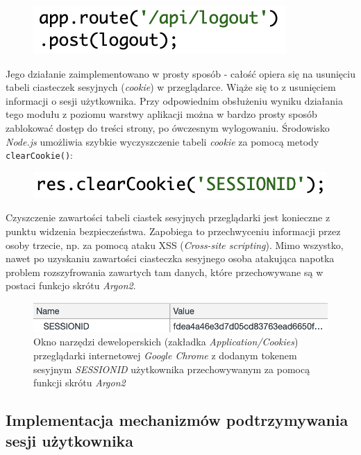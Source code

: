 \begin{figure}[H]
	\includegraphics[scale=0.7]{images/code/res_logout.png}
\end{figure}

Jego działanie zaimplementowano w prosty sposób - całość opiera się na usunięciu tabeli ciasteczek sesyjnych (\textit{cookie}) w przeglądarce. Wiąże się to z usunięciem informacji o sesji użytkownika. Przy odpowiednim obsłużeniu wyniku działania tego modułu z poziomu warstwy aplikacji można w bardzo prosty sposób zablokować dostęp do treści strony, po ówczesnym wylogowaniu. Środowisko \textit{Node.js} umożliwia szybkie wyczyszczenie tabeli \textit{cookie} za pomocą metody \texttt{clearCookie()}:

\begin{figure}[H]
	\includegraphics[scale=0.7]{images/code/clear_cookie.png}
\end{figure}

Czyszczenie zawartości tabeli ciastek sesyjnych przeglądarki jest konieczne z punktu widzenia bezpieczeństwa. Zapobiega to przechwyceniu informacji przez osoby trzecie, np. za pomocą ataku XSS (\textit{Cross-site scripting}). Mimo wszystko, nawet po uzyskaniu zawartości ciasteczka sesyjnego osoba atakująca napotka problem rozszyfrowania zawartych tam danych, które przechowywane są w postaci funkcjo skrótu \textit{Argon2}.

\begin{figure}[H]
	\centering\includegraphics[scale=1.0]{images/nodejs/argon2_cookie.png}
	\caption{Okno narzędzi deweloperskich (zakładka \textit{Application/Cookies}) przeglądarki internetowej \textit{Google Chrome} z dodanym tokenem sesyjnym \textit{SESSIONID} użytkownika przechowywanym za pomocą funkcji skrótu \textit{Argon2}}
	\label{Rys:cookie_sessionID}
\end{figure}

\subsection{Implementacja mechanizmów podtrzymywania sesji użytkownika}
